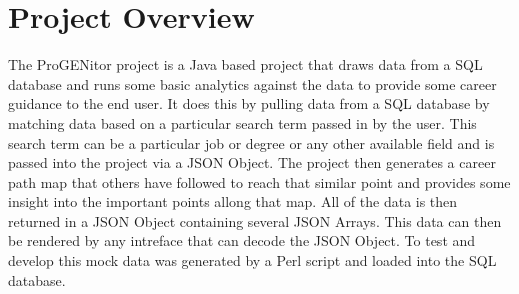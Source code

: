 \section{Project Overview}
\label{sect:project-overview}
The ProGENitor project is a Java based project that draws data from a SQL
database and runs some basic analytics against the data to provide some career
guidance to the end user.  It does this by pulling data from a SQL database by
matching data based on a particular search term passed in by the user.  This
search term can be a particular job or degree or any other available field and
is passed into the project via a JSON Object.  The project then generates a
career path map that others have followed to reach that similar point and
provides some insight into the important points allong that map.  All of the
data is then returned in a JSON Object containing several JSON Arrays.  This
data can then be rendered by any intreface that can decode the JSON Object.  To
test and develop this mock data was generated by a Perl script and loaded into
the SQL database.

